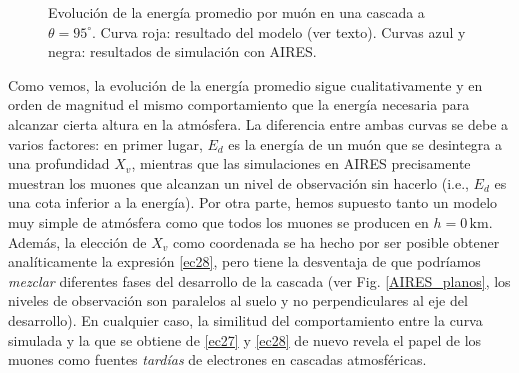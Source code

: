 \documentclass[11 pt, a4paper]{article} %
\numberwithin{equation}{section}
\numberwithin{figure}{section}
\numberwithin{table}{section}
\begin{document}
\begin{figure}[H]
	\centering
	\hspace{10mm}
	\caption{Evolución de la energía promedio por muón en una cascada a $\theta = 95^\circ$. Curva roja: resultado del modelo (ver texto). Curvas azul y negra: resultados de simulación con AIRES.}
	\label{evol_emu}
\end{figure}
Como vemos, la evolución de la energía promedio sigue cualitativamente y en orden de magnitud el mismo comportamiento que la energía necesaria para alcanzar cierta altura en la atmósfera. La diferencia entre ambas curvas se debe a varios factores: en primer lugar, $E_d$ es la energía de un muón que se desintegra a una profundidad $X_v$, mientras que las simulaciones en AIRES precisamente muestran los muones que alcanzan un nivel de observación sin hacerlo (i.e., $E_d$ es una cota inferior a la energía). Por otra parte, hemos supuesto tanto un modelo muy simple de atmósfera como que todos los muones se producen en $h=0\,\mathrm{km}$. Además, la elección de $X_v$ como coordenada se ha hecho por ser posible obtener analíticamente la expresión \eqref{ec28}, pero tiene la desventaja de que podríamos \textit{mezclar} diferentes fases del desarrollo de la cascada (ver Fig. \ref{AIRES_planos}, los niveles de observación son paralelos al suelo y no perpendiculares al eje del desarrollo). En cualquier caso, la similitud del comportamiento entre la curva simulada y la que se obtiene de \eqref{ec27} y \eqref{ec28} de nuevo revela el papel de los muones como fuentes \textit{tardías} de electrones en cascadas atmosféricas.
\end{document}
